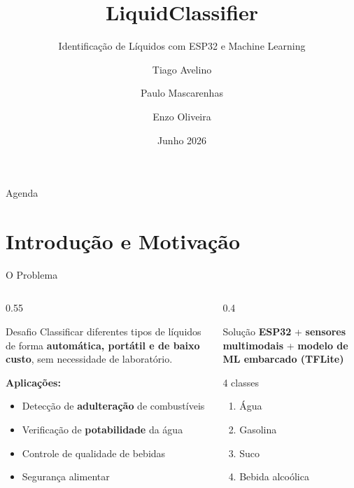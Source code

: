 \documentclass[aspectratio=169, 11pt]{beamer}
\title[LiquidClassifier]{LiquidClassifier}
\subtitle{Identificação de Líquidos com ESP32 e Machine Learning}
\author[Tiago, Paulo, Enzo]{%
  Tiago Avelino \and Paulo Mascarenhas \and Enzo Oliveira%
}
\institute{Laboratório 7 — Sistemas Embarcados com IA}
\date{Junho 2026}
\begin{document}
\begin{frame}[plain]
  \titlepage
\end{frame}

\begin{frame}{Agenda}
  \tableofcontents
\end{frame}

\section{Introdução e Motivação}

\begin{frame}{O Problema}
  \begin{columns}[T]
    \begin{column}{0.55\textwidth}
      \begin{block}{Desafio}
        Classificar diferentes tipos de líquidos de forma \textbf{automática, portátil e de baixo custo}, sem necessidade de laboratório.
      \end{block}
      \vspace{0.3cm}
      \textbf{Aplicações:}
      \begin{itemize}
        \item Detecção de \textbf{adulteração} de combustíveis
        \item Verificação de \textbf{potabilidade} da água
        \item Controle de qualidade de bebidas
        \item Segurança alimentar
      \end{itemize}
    \end{column}
    \begin{column}{0.4\textwidth}
      \begin{block}{Solução}
        \centering
        \textbf{ESP32} + \textbf{sensores multimodais} + \textbf{modelo de ML embarcado (TFLite)}
      \end{block}
      \vspace{0.3cm}
      \begin{alertblock}{4 classes}
        \begin{enumerate}
          \item Água
          \item Gasolina
          \item Suco
          \item Bebida alcoólica
        \end{enumerate}
      \end{alertblock}
    \end{column}
  \end{columns}
\end{frame}
\end{document}
